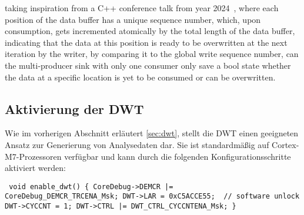 taking inspiration from a C++ conference talk from year
2024~\cite{CppCon2024LockFreeQueue}, where each position of the data buffer has
a unique sequence number, which, upon consumption, gets incremented atomically
by the total length of the data buffer, indicating that the data at this
position is ready to be overwritten at the next iteration by the writer, by
comparing it to the global write sequence number, can the multi-producer sink
with only one consumer only save a bool state whether the data at a specific
location is yet to be consumed or can be overwritten. %


\subsection{Aktivierung der DWT}

Wie im vorherigen Abschnitt erläutert \ref{sec:dwt}, stellt die DWT einen
geeigneten Ansatz zur Generierung von Analysedaten dar. Sie ist standardmäßig
auf Cortex-M7-Prozessoren verfügbar und kann durch die folgenden
Konfigurationsschritte aktiviert werden:

\begin{code} \begin{verbatim} void enable_dwt() { CoreDebug->DEMCR |=
CoreDebug_DEMCR_TRCENA_Msk; DWT->LAR = 0xC5ACCE55;  // software unlock
DWT->CYCCNT = 1; DWT->CTRL |= DWT_CTRL_CYCCNTENA_Msk; } \end{verbatim}
\end{code}
